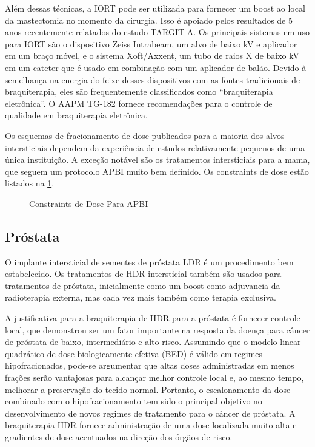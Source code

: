 \documentclass[11pt,a4paper]{article}
\begin{document}
	Além dessas técnicas, a IORT pode ser utilizada para fornecer um boost ao local da mastectomia no momento da cirurgia. Isso é apoiado pelos resultados de 5 anos recentemente relatados do estudo TARGIT-A. Os principais sistemas em uso para IORT são o dispositivo Zeiss Intrabeam, um alvo de baixo kV e aplicador em um braço móvel, e o sistema Xoft/Axxent, um tubo de raios X de baixo kV em um cateter que é usado em combinação com um aplicador de balão. Devido à semelhança na energia do feixe desses dispositivos com as fontes tradicionais de braquiterapia, eles são frequentemente classificados como “braquiterapia eletrônica”. O AAPM TG-182 fornece recomendações para o controle de qualidade em braquiterapia eletrônica.

	Os esquemas de fracionamento de dose publicados para a maioria dos alvos intersticiais dependem da experiência de estudos relativamente pequenos de uma única instituição. A exceção notável são os tratamentos intersticiais para a mama, que seguem um protocolo APBI muito bem definido. Os constraints de dose estão listados na \ref{fig:constraintsApbi}.

	\begin{figure}[h]
		\centering
		\caption{Constraints de Dose Para APBI}
		\label{fig:constraintsApbi}
	\end{figure}

\subsection*{Próstata}

	O implante intersticial de sementes de próstata LDR é um procedimento bem estabelecido. Os tratamentos de HDR intersticial também são usados para tratamentos de próstata, inicialmente como um boost como adjuvancia da radioterapia externa, mas cada vez mais também como terapia exclusiva.

	A justificativa para a braquiterapia de HDR para a próstata é fornecer controle local, que demonstrou ser um fator importante na resposta da doença para câncer de próstata de baixo, intermediário e alto risco. Assumindo que o modelo linear-quadrático de dose biologicamente efetiva (BED) é válido em regimes hipofracionados, pode-se argumentar que altas doses administradas em menos frações serão vantajosas para alcançar melhor controle local e, ao mesmo tempo, melhorar a preservação do tecido normal. Portanto, o escalonamento da dose combinado com o hipofracionamento tem sido o principal objetivo no desenvolvimento de novos regimes de tratamento para o câncer de próstata. A braquiterapia HDR fornece administração de uma dose localizada muito alta e gradientes de dose acentuados na direção dos órgãos de risco.
\end{document}
